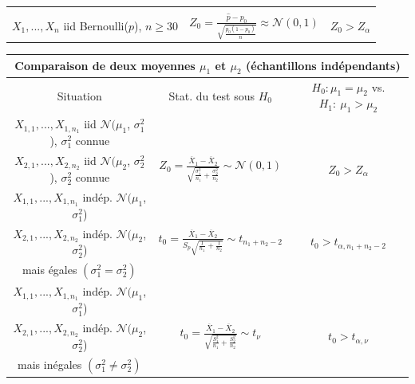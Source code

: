 \documentclass[12pt,french]{article}
\begin{document}
{\begin{center}
\begin{tabular}{|c|c|c|}
\hline \hline
 &  &
 \\
$ X_1,...,X_n$ iid Bernoulli($p$), $n\geq 30$
 & $\displaystyle
Z_{0}=\frac{{\hat p} - p_{0}}
{\sqrt{\displaystyle\frac{p_{0}(1-p_{0})}{n}}} \approx \mathcal{N}(0,1)$ &
$Z_{0}>Z_{\alpha}$
\\

\hline
\end{tabular}
\end{center}


\begin{center}
\begin{tabular}{|c|c|c|}
\hline
\multicolumn{3}{|c|}{{\bf Comparaison de deux moyennes $\mu_{1}$ et
$\mu_{2}$ (échantillons indépendants)}}
\\
\hline Situation & Stat. du test sous $H_0$& $H_{0}:\mu_{1} =
\mu_{2}$ vs. $H_{1}:\  \mu_{1} > \mu_{2}$
\\

\hline
\hline
 $X_{1,1}, ..., X_{1,n_1}$ iid $\mathcal{N}(\mu_1$, $\sigma^2_1$), $\sigma^2_1$ connue &&\\
  $X_{2,1}, ..., X_{2,n_2}$ iid $\mathcal{N}(\mu_2$, $\sigma^2_2$), $\sigma^2_2$ connue & $\displaystyle Z_0 =
\frac{\overline X_1 -\overline X_2}{\sqrt{\frac{\sigma_1^2}{n_1} +
\frac{\sigma^2_2}{n_2}}} \sim \mathcal{N}(0,1)$ & $Z_0 > Z_{\alpha}$
\\

\hline
$X_{1,1}, ..., X_{1,n_1}$ indép. $\mathcal{N}(\mu_1$, $\sigma^2_1$)& & \\
$X_{2,1}, ..., X_{2,n_2}$ indép. $\mathcal{N}(\mu_2$, $\sigma^2_2$)&
$\displaystyle t_0 = \frac{\overline X_1 -\overline X_2}{S_p
\sqrt{\frac{1}{n_1} + \frac{1}{n_2}}} \sim t_{n_1+n_2-2}$ & $t_0 >
t_{\alpha,n_1+n_2-2}$
\\

mais égales $(\sigma_{1}^{2}=\sigma_{2}^{2})$ &  &
\\
\hline

$X_{1,1}, ..., X_{1,n_1}$ indép. $\mathcal{N}(\mu_1$, $\sigma^2_1$)& & \\
$X_{2,1}, ..., X_{2,n_2}$ indép. $\mathcal{N}(\mu_2$, $\sigma^2_2$)&
$\displaystyle t_0 = \frac{\overline X_1 -\overline X_2}{\sqrt{ \frac{S_1^2}{n_1} + \frac{S^2_2}{n_2}}} \sim t_{\nu}$ & $t_0 >
t_{\alpha,\nu}$
\\

mais inégales $(\sigma_{1}^{2}\neq \sigma_{2}^{2})$ &  &
\\
\hline
\end{tabular}
\end{center}

}
\end{document}
